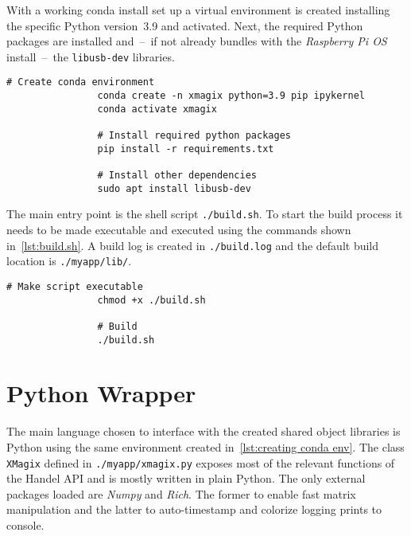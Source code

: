             With a working conda install set up a virtual environment is created installing the specific Python version~\num{3.9} and activated.
            Next, the required Python packages are installed and~--~if not already bundles with the \textit{Raspberry Pi OS} install~--~the \texttt{libusb-dev} libraries.
            \begin{lstlisting}[style=mybash, caption={[Creating conda environment and installing dependencies]Creating conda environment and installing dependencies.}, label={lst:creating conda env}, gobble=12]
                # Create conda environment
                conda create -n xmagix python=3.9 pip ipykernel
                conda activate xmagix

                # Install required python packages
                pip install -r requirements.txt

                # Install other dependencies
                sudo apt install libusb-dev
            \end{lstlisting}

            The main entry point is the shell script \texttt{./build.sh}.
            To start the build process it needs to be made executable and executed using the commands shown in~\cref{lst:build.sh}.
            A build log is created in \texttt{./build.log} and the default build location is \texttt{./myapp/lib/}.
            \begin{lstlisting}[style=mybash, caption={[Executing build script]Executing build script.}, label={lst:build.sh}, gobble=12]
                # Make script executable
                chmod +x ./build.sh

                # Build
                ./build.sh
            \end{lstlisting}
        \section{Python Wrapper}
            The main language chosen to interface with the created shared object libraries is Python using the same environment created in~\cref{lst:creating conda env}.
            The class \texttt{XMagix} defined in \texttt{./myapp/xmagix.py} exposes most of the relevant functions of the Handel API and is mostly written in plain Python.
            The only external packages loaded are \textit{Numpy} and \textit{Rich}.
            The former to enable fast matrix manipulation and the latter to auto-timestamp and colorize logging prints to console.\par\medskip

